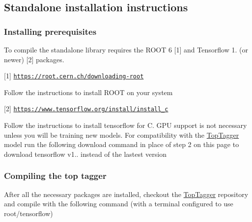 \subsection*{Standalone installation instructions}

\subsubsection*{Installing prerequisites}

To compile the standalone library requires the R\-O\-O\-T 6 \mbox{[}1\mbox{]} and Tensorflow 1. (or newer) \mbox{[}2\mbox{]} packages.

\mbox{[}1\mbox{]} \href{https://root.cern.ch/downloading-root}{\tt https\-://root.\-cern.\-ch/downloading-\/root}

Follow the instructions to install R\-O\-O\-T on your system

\mbox{[}2\mbox{]} \href{https://www.tensorflow.org/install/install_c}{\tt https\-://www.\-tensorflow.\-org/install/install\-\_\-c}

Follow the instructions to install tensorflow for C. G\-P\-U support is not necessary unless you will be training new models. For compatibility with the \hyperlink{classTopTagger}{Top\-Tagger} model run the following download command in place of step 2 on this page to download tensorflow v1.. instead of the lastest version




\subsubsection*{Compiling the top tagger}

After all the necessary packages are installed, checkout the \hyperlink{classTopTagger}{Top\-Tagger} repository and compile with the following command (with a terminal configured to use root/tensorflow)


